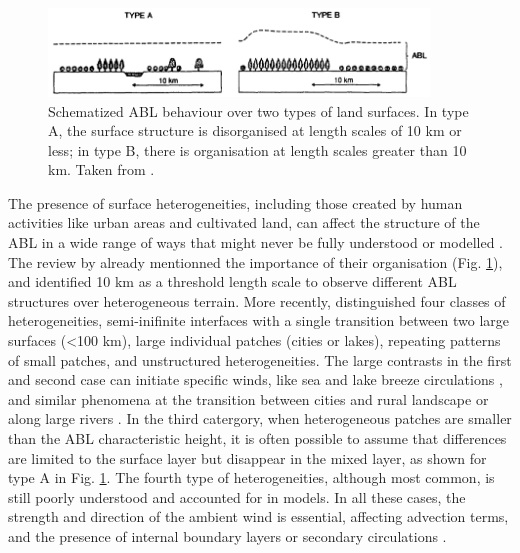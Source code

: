 \begin{figure}[ht]
    \centering
    \includegraphics[width=0.9\textwidth]{images/intro/abl_heterog_garratt.png}
    \caption{Schematized ABL behaviour over two types of land surfaces. In type A, the surface structure is disorganised at length scales of 10 km or less; in type B, there is organisation at length scales greater than 10 km. Taken from \citet{garratt_review_1994}.}
    \label{fig:abl_heterog}
\end{figure}

The presence of surface heterogeneities, including those created by human activities like urban areas and cultivated land, can affect the structure of the ABL in a wide range of ways that might never be fully understood or modelled \citep{bou-zeid_persistent_2020}. 
The review by \citet{garratt_review_1994} already mentionned the importance of their organisation (Fig. \ref{fig:abl_heterog}), and identified 10 km as a threshold length scale to observe different ABL structures over heterogeneous terrain. 
More recently, \citet{bou-zeid_persistent_2020} distinguished four classes of heterogeneities, semi-inifinite interfaces with a single transition between two large surfaces (<100 km), large individual patches (cities or lakes), repeating patterns of small patches, and unstructured heterogeneities. 
The large contrasts in the first and second case can initiate specific winds, like sea and lake breeze circulations \citep{crosman_sea_2010,kenny_numerical_2017}, and similar phenomena at the transition between cities and rural landscape \citep{hidalgo_urban-breeze_2008,omidvar_plume_2020} or along large rivers \citep{zhang_large-eddy_2023}. In the third catergory, when heterogeneous patches are smaller than the ABL characteristic height, it is often possible to assume that differences are limited to the surface layer but disappear in the mixed layer, as shown for type A in Fig. \ref{fig:abl_heterog}. The fourth type of heterogeneities, although most common, is still poorly understood and accounted for in models.
In all these cases, the strength and direction of the ambient wind is essential, affecting advection terms, and the presence of internal boundary layers or secondary circulations \citep{anderson_turbulent_2020, zhang_large-eddy_2023}. 
